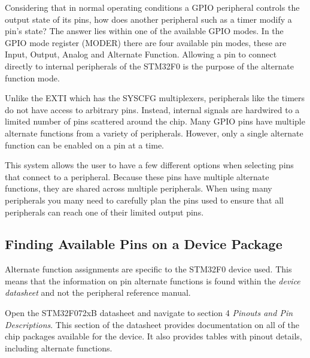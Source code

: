 \documentclass[11pt,fleqn]{book} %
\begin{document}
Considering that in normal operating conditions a GPIO peripheral controls the output state of its pins, how does another peripheral such as a timer modify a pin's state? The answer lies within one of the available GPIO modes. In the GPIO mode register (MODER) there are four available pin modes, these are Input, Output, Analog and Alternate Function. Allowing a pin to connect directly to internal peripherals of the STM32F0 is the purpose of the alternate function mode. 

Unlike the EXTI which has the SYSCFG multiplexers, peripherals like the timers do not have access to arbitrary pins. Instead, internal signals are hardwired to a limited number of pins scattered around the chip. Many GPIO pins have multiple alternate functions from a variety of peripherals. However, only a single alternate function can be enabled on a pin at a time.

This system allows the user to have a few different options when selecting pins that connect to a peripheral. Because these pins have multiple alternate functions, they are shared across multiple peripherals. When using many peripherals you many need to carefully plan the pins used to ensure that all peripherals can reach one of their limited output pins.  

%    
    
    \subsection{Finding Available Pins on a Device Package}
    
    Alternate function assignments are specific to the STM32F0 device used. This means that the information on pin alternate functions is found within the \textit{device datasheet} and not the peripheral reference manual.
    
    Open the STM32F072xB datasheet and navigate to section 4 \textit{Pinouts and Pin Descriptions}. This section of the datasheet provides documentation on all of the chip packages available for the device. It also provides tables with pinout details, including alternate functions.
    
\end{document}
